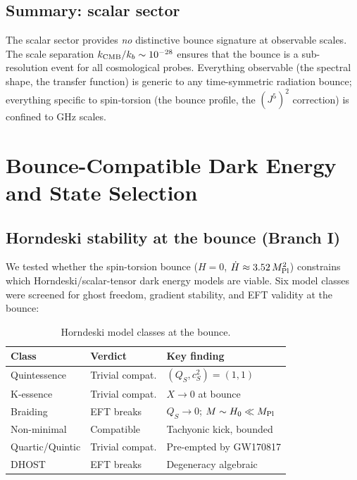 \documentclass[aps,prd,twocolumn,superscriptaddress,showpacs,preprintnumbers,
  nofootinbib,longbibliography,floatfix]{revtex4-2}
\newcommand{\MPl}{M_{\rm Pl}}
\begin{document}
\subsection{Summary: scalar sector}

The scalar sector provides \textit{no} distinctive bounce signature at
observable scales. The scale separation $k_{\rm CMB}/k_b \sim 10^{-28}$
ensures that the bounce is a sub-resolution event for all cosmological
probes. Everything observable (the spectral shape, the transfer function)
is generic to any time-symmetric radiation bounce; everything specific to
spin-torsion (the bounce profile, the $(J^5)^2$ correction) is confined
to GHz scales.


\section{Bounce-Compatible Dark Energy and State Selection}\label{sec:compat}

\subsection{Horndeski stability at the bounce (Branch I)}\label{sec:horndeski}

We tested whether the spin-torsion bounce ($H=0$, $\dot{H} \approx
3.52\,\MPl^2$) constrains which Horndeski/scalar-tensor dark energy
models are viable. Six model classes were screened for ghost freedom,
gradient stability, and EFT validity at the bounce:

\begin{table}[t]
\centering
\caption{\label{tab:horndeski} Horndeski model classes at the bounce.}
\begin{ruledtabular}
\begin{tabular}{lll}
\textbf{Class} & \textbf{Verdict} & \textbf{Key finding} \\
\hline
Quintessence & Trivial compat. & $(Q_S,c_S^2) = (1,1)$ \\
K-essence & Trivial compat. & $X \to 0$ at bounce \\
Braiding & EFT breaks & $Q_S \to 0$; $M \sim H_0 \ll \MPl$ \\
Non-minimal & Compatible & Tachyonic kick, bounded \\
Quartic/Quintic & Trivial compat. & Pre-empted by GW170817 \\
DHOST & EFT breaks & Degeneracy algebraic \\
\end{tabular}
\end{ruledtabular}
\end{table}
\end{document}
